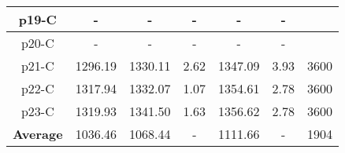 \begin{table*}[!ht]
\begin{minipage}{\columnwidth}
{\begin{tabular}{@{}ccccccc@{}}
			\midrule
			p19-C & - & - & - & - & - &  \\
			\midrule
			p20-C & - & - & - & - & - &  \\
			\midrule
			p21-C & 1296.19 & 1330.11 & 2.62 & 1347.09 & 3.93 & 3600 \\
			\midrule
			p22-C & 1317.94 & 1332.07 & 1.07 & 1354.61 & 2.78 & 3600 \\
			\midrule
			p23-C & 1319.93 & 1341.50 & 1.63 & 1356.62 & 2.78 & 3600 \\
			\midrule
			\textbf{Average} & 1036.46 & 1068.44 & - & 1111.66 & - & 1904 \\ \bottomrule
		\end{tabular}%
	}
	\label{tab:table2}
\end{minipage}
\end{table*}